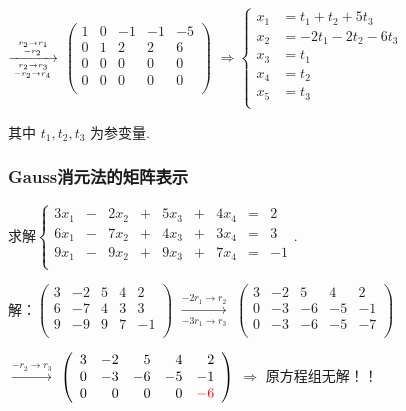 \begin{frame}
$\xrightarrow[r_2\rightarrow r_3 \atop -r_2 \rightarrow r_4]{r_2\rightarrow r_1 \atop -r_2}$
$\left(\begin{array}{rrrrr}1&0&-1&-1&-5\\0&1&2&2&6\\0&0&0&0&0\\0&0&0&0&0\\\end{array}\right)$	\pp
$\Rightarrow \left\{\begin{array}{rl}
x_1 &= t_1 + t_2 + 5t_3 \\
x_2&=-2t_1-2t_2-6t_3 \\
x_3 &= t_1\\
x_4 &= t_2\\
x_5 &= t_3\\
\end{array}\right.$\\
\begin{flushright}
其中 $t_1,t_2,t_3$ 为参变量.
\end{flushright}
\end{frame}




\begin{frame}\frametitle{Gauss消元法的矩阵表示}
\begin{example}[无解]
求解$\left\{\begin{array}{rrrrrrrrr}
3x_1 & - & 2x_2 & + & 5x_3 & + & 4x_4 & = & 2 \\
6x_1 & - & 7x_2 & + & 4x_3 & + & 3x_4 & = & 3 \\
9x_1 & - & 9x_2 & + & 9x_3 & + & 7x_4 & = & -1 \\
\end{array}\right.$.
\end{example}

 \pp
\bigskip

解：$\left(\begin{array}{rrrrr}3&-2&5&4&2\\6&-7&4&3&3\\9&-9&9&7&-1\\\end{array}\right)$	\pp
$\xrightarrow[-3r_1\rightarrow r_3]{-2r_1\rightarrow r_2}$
$\left(\begin{array}{rrrrr}3&-2&5&4&2\\0&-3&-6&-5&-1\\0&-3&-6&-5&-7\\\end{array}\right)$	\pp
\bigskip

$\xrightarrow{-r_2\rightarrow r_3}$
$\left(\begin{array}{rrrrr}3&-2&5&4&2\\0&-3&-6&-5&-1\\0&0&0&0&\red{-6}\\\end{array}\right)$ \pp 	$\Rightarrow$ 原方程组无解！！
\end{frame}






